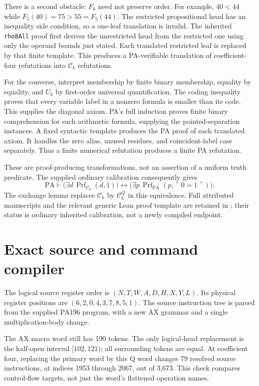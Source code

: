 \documentclass[11pt,letterpaper]{article}
\newcommand{\PA}{\mathrm{PA}}
\newcommand{\Prf}{\operatorname{Prf}}
\newcommand{\file}[1]{\texttt{\path{#1}}}
\begin{document}
There is a second obstacle: $F_k$ need not preserve order. For example,
$40<44$ while $F_5(40)=75>55=F_5(44)$. The restricted propositional head
has an inequality side condition, so a one-leaf translation is invalid.
The inherited \texttt{rho8All} proof first derives the unrestricted head
from the restricted one using only the operand bounds just stated.
Each translated restricted leaf is replaced by that finite template.
This produces a PA-verifiable translation of coefficient-four refutations
into $\mathcal C_k$ refutations.

For the converse, interpret membership by finite binary membership,
equality by equality, and $U_k$ by first-order universal quantification.
The coding inequality proves that every variable label in a nonzero
formula is smaller than its code. This supplies the diagonal axiom.
PA's full induction proves finite binary comprehension for each arithmetic
formula, supplying the pointed-separation instances. A fixed syntactic
template produces the PA proof of each translated axiom. It handles the
zero alias, unused residues, and coincident-label case separately.
Thus a finite numerical refutation produces a finite PA refutation.

These are proof-producing transformations, not an assertion of a uniform
truth predicate. The supplied ordinary calibration consequently gives
\[
\PA\vdash
\bigl(\exists d\,\Prf_{\mathcal C_k}(d,1)\bigr)
\leftrightarrow
\bigl(\exists p\,\Prf_{\PA}(p,\ulcorner0=1\urcorner)\bigr).
\]
The exchange lemma replaces $\mathcal C_k$ by $\mathcal C_k^Q$ in this
equivalence. Full attributed manuscripts and the relevant generic Lean
proof template are retained in \file{calibration/}; their status is
ordinary inherited calibration, not a newly compiled endpoint.

\section{Exact source and command compiler}

The logical source register order is $(N,T,W,A,D,H,X,Y,L)$. Its physical
register positions are $(6,2,0,4,3,7,8,5,1)$. The source instruction tree
is parsed from the supplied PA196 program, with a new AX grammar and a
single multiplication-body change.

The AX macro word still has 190 tokens. The only logical-head replacement
is the half-open interval $[102,121)$; all surrounding tokens are equal.
At coefficient four, replacing the primary word by this Q word changes
79 resolved source instructions, at indices 1953 through 2067, out of
3,673. This check compares control-flow targets, not just the word's
flattened operation names.
\end{document}
